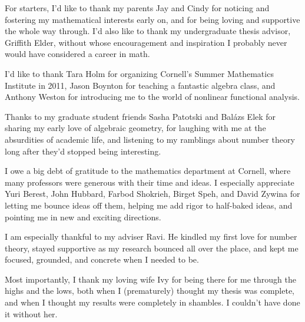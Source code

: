 \documentclass[phd,cornellheadings,tocprelim]{cornell}
\begin{document}
\begin{acknowledgements}
For starters, I'd like to thank my parents Jay and Cindy for noticing and 
fostering my mathematical interests early on, and for being loving and 
supportive the whole way through. I'd also like to thank my undergraduate 
thesis advisor, Griffith Elder, without whose encouragement and inspiration 
I probably never would have considered a career in math. 

I'd like to thank Tara Holm for organizing Cornell's Summer Mathematics 
Institute in 2011, Jason Boynton for teaching a fantastic algebra class, and 
Anthony Weston for introducing me to the world of nonlinear functional 
analysis. 

Thanks to my graduate student friends Sasha Patotski and Bal\'azs Elek for 
sharing my early love of algebraic geometry, for laughing with me at the 
absurdities of academic life, and listening to my ramblings about number 
theory long after they'd stopped being interesting. 

I owe a big debt of gratitude to the mathematics department at Cornell, where 
many professors were generous with their time and ideas. I especially 
appreciate Yuri Berest, John Hubbard, Farbod Shokrieh, Birget Speh, and David 
Zywina for letting me bounce ideas off them, helping me add rigor to 
half-baked ideas, and pointing me in new and exciting directions. 

I am especially thankful to my adviser Ravi. He kindled my first love for 
number theory, stayed supportive as my research bounced all over the place, 
and kept me focused, grounded, and concrete when I needed to be. 

Most importantly, I thank my loving wife Ivy for being there for me 
through the highs and the lows, both when I (prematurely) thought my thesis was 
complete, and when I thought my results were completely in shambles. I couldn't 
have done it without her. 
\end{acknowledgements}

\contentspage
\normalspacing
\setcounter{page}{1}
\pagestyle{cornell}
\addtolength{\parskip}{0.5\baselineskip}

















\printbibliography[heading=bibintoc]
\end{document}
